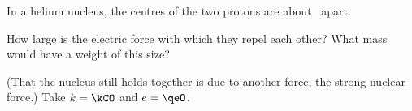 In a helium nucleus, the centres of the two protons are about \dpO\ apart.

\begin{abcliste}
\abc How large is the electric force with which they repel each other?
\abc What mass would have a weight of this size?
\end{abcliste}

(That the nucleus still holds together is due to another force, the strong nuclear force.) Take $k = \kCO$ and $e = \qeO$.
